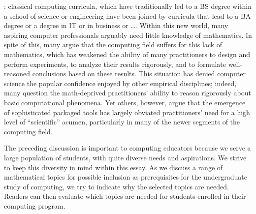: classical
computing curricula, which have traditionally led to a BS degree
within a school of science or engineering have been joined by
curricula that lead to a BA degree or a degree in IT or in business or
\ldots.  Within this new world, many aspiring computer professionals
arguably need little knowledge of mathematics.  In spite of this, many
argue that the computing field suffers for this lack of mathematics,
which has weakened the ability of many practitioners to design and
perform experiments, to analyze their results rigorously, and to
formulate well-reasoned conclusions based on these results.  This
situation has denied computer science the popular confidence enjoyed
by other empirical disciplines; indeed, many question the
math-deprived practitioners' ability to reason rigorously about basic
computational phenomena.  Yet others, however, argue that the emergence
of sophisticated packaged tools has largely obviated practitioners'
need for a high level of ``scientific'' acumen, particularly in many
of the newer segments of the computing field.

The preceding discussion is important to computing educators because
we serve a large population of students, with quite diverse needs and
aspirations.  We strive to keep this diversity in mind within this
essay.  As we discuss a range of mathematical topics for possible
inclusion as prerequisites for the undergraduate study of computing,
we try to indicate why the selected topics are needed.  Readers can
then evaluate which topics are needed for students enrolled in their
computing program.







